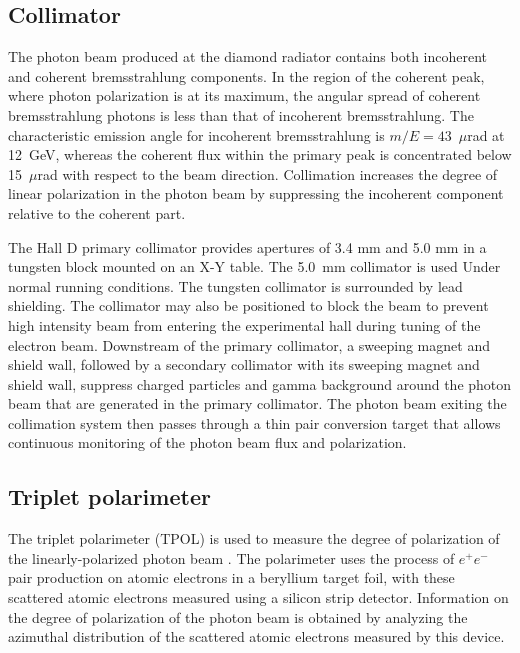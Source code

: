 \subsection{Collimator}
The photon beam produced at the diamond radiator contains both incoherent
and coherent bremsstrahlung components. In the region of the coherent peak,
where photon polarization is at its maximum, the angular spread of coherent
bremsstrahlung photons is less than that of incoherent bremsstrahlung.
The characteristic emission angle for incoherent bremsstrahlung is
$m/E = 43$~$\mu$rad at 12~GeV, whereas the coherent flux within the
primary peak is concentrated below 15~$\mu$rad with respect to the beam
direction. Collimation increases the degree of linear polarization in
the photon beam by suppressing the incoherent component relative to the
coherent part.

The Hall D primary collimator provides apertures of 3.4 mm and 5.0 mm in a
tungsten block mounted on an X-Y table. The 5.0~mm collimator is used
Under normal \GX{} running conditions.
The tungsten collimator is surrounded by lead shielding.
The collimator may also be positioned to block the beam to prevent
high intensity beam from entering the experimental hall during tuning
of the electron beam. Downstream of the primary collimator, a
sweeping magnet and shield wall, followed by a secondary collimator
with its sweeping magnet and shield wall, suppress charged
particles and gamma background around the photon beam that are
generated in the primary collimator. The photon beam exiting the
collimation system then passes through a thin pair conversion target
that allows continuous monitoring of the photon beam flux and polarization.

\subsection{Triplet polarimeter \label{sec:tpol}}
The triplet polarimeter (TPOL) is used to measure the degree of polarization
of the linearly-polarized photon beam \cite{DUGGER2017115}.
The polarimeter uses the process of $e^+e^-$ pair production on atomic electrons 
in a beryllium target foil, with these scattered atomic electrons
measured using a silicon strip detector.
Information on the degree of polarization of the photon beam is
obtained by analyzing the azimuthal distribution of the scattered
atomic electrons measured by this device.

